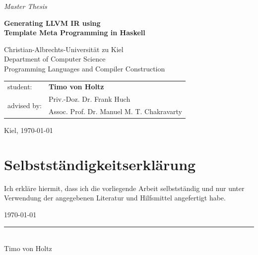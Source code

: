 \documentclass[a4paper,bibliography=totocnumbered,parskip,headsepline]{scrbook}
\begin{document}
\frontmatter

\begin{titlepage}

\begin{center}
{\huge \textit{Master Thesis}}

\vspace{2cm}

{\Large \textbf{Generating LLVM IR using \\Template Meta Programming in Haskell}}

\vspace{1.75cm}

\vspace{1.75cm}

{\large Christian-Albrechts-Universität zu Kiel\\
   Department of Computer Science\\
   Programming Languages and Compiler Construction
}

\end{center}

\vspace{2cm}

\begin{tabular}{ll}
student: & \textbf{Timo von Holtz} \\
\multirow{2}{*}{advised by:} & Priv.-Doz. Dr. Frank Huch\\
 & Assoc. Prof. Dr. Manuel M. T. Chakravarty
\end{tabular}

\vspace{1cm}

\begin{center}
Kiel, \today
\end{center}

\end{titlepage}

\chapter*{Selbstständigkeitserklärung}

Ich erkläre hiermit, dass ich die vorliegende Arbeit selbstständig und nur unter Verwendung der angegebenen Literatur und Hilfsmittel angefertigt habe.


\today
\begin{flushright}
\rule{6cm}{0.4pt} \\
Timo von Holtz
\end{flushright}
\clearpage
\end{document}
